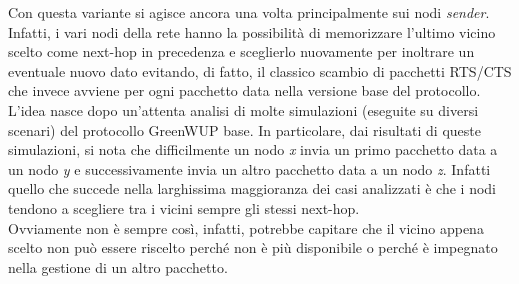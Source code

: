 Con questa variante si agisce ancora una volta principalmente sui nodi \textit{sender}.\\
Infatti, i vari nodi della rete hanno la possibilità di memorizzare l'ultimo vicino scelto come next-hop in precedenza e sceglierlo nuovamente per inoltrare un eventuale nuovo dato evitando, di fatto, il classico scambio di pacchetti RTS/CTS che invece avviene per ogni pacchetto data nella versione base del protocollo.\\

L'idea nasce dopo un'attenta analisi di molte simulazioni (eseguite su diversi scenari) del protocollo GreenWUP base. In particolare, dai risultati di queste simulazioni, si nota che difficilmente un nodo \textit{x} invia un primo pacchetto data a un nodo \textit{y} e successivamente invia un altro pacchetto data a un nodo \textit{z}. Infatti quello che succede nella larghissima maggioranza dei casi analizzati è che i nodi tendono a scegliere tra i vicini sempre gli stessi next-hop.\\
Ovviamente non è sempre così, infatti, potrebbe capitare che il vicino appena scelto non può essere riscelto perché non è più disponibile o perché è impegnato nella gestione di un altro pacchetto.\\

